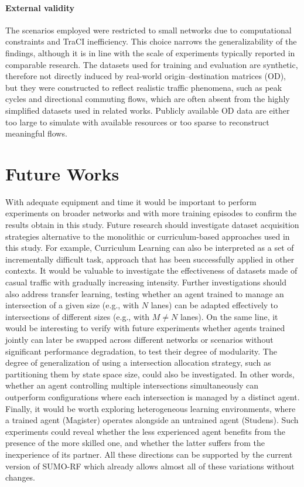 \paragraph{External validity}

The scenarios employed were restricted to small networks due to computational constraints and TraCI inefficiency.
This choice narrows the generalizability of the findings, although it is in line with the scale of experiments typically reported in comparable research.
The datasets used for training and evaluation are synthetic, therefore not directly induced by real-world origin–destination matrices (OD), but they were constructed to reflect realistic traffic phenomena, such as peak cycles and directional commuting flows, which are often absent from the highly simplified datasets used in related works.
Publicly available OD data are either too large to simulate with available resources or too sparse to reconstruct meaningful flows.

\section{Future Works}

With adequate equipment and time it would be important to perform experiments on broader networks and with more training episodes to confirm the results obtain in this study.
Future research should investigate dataset acquisition strategies alternative to the monolithic or curriculum-based approaches used in this study.
For example, Curriculum Learning can also be interpreted as a set of incrementally difficult task, approach that has been successfully applied in other contexts.
It would be valuable to investigate the effectiveness of datasets made of casual traffic with gradually increasing intensity.
Further investigations should also address transfer learning, testing whether an agent trained to manage an intersection of a given size (e.g., with $N$ lanes) can be adapted effectively to intersections of different sizes (e.g., with $M \ne N$ lanes).
On the same line, it would be interesting to verify with future experiments whether agents trained jointly can later be swapped across different networks or scenarios without significant performance degradation, to test their degree of modularity.
The degree of generalization of using a intersection allocation strategy, such as partitioning them by state space size, could also be investigated.
In other words, whether an agent controlling multiple intersections simultaneously can outperform configurations where each intersection is managed by a distinct agent.
Finally, it would be worth exploring heterogeneous learning environments, where a trained agent (Magister) operates alongside an untrained agent (Studens).
Such experiments could reveal whether the less experienced agent benefits from the presence of the more skilled one, and whether the latter suffers from the inexperience of its partner.
All these directions can be supported by the current version of SUMO-RF which already allows almost all of these variations without changes.
